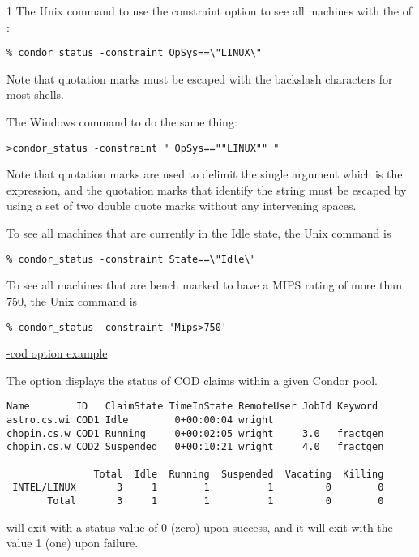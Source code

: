 \begin{ManPage}{\label{man-condor-status}}{1}
The Unix command
to use the constraint option to see all machines with the 
of :
\begin{verbatim}
% condor_status -constraint OpSys==\"LINUX\"
\end{verbatim}
Note that quotation marks must be escaped with the backslash characters
for most shells.

The Windows command to do the same thing:
\begin{verbatim}
>condor_status -constraint " OpSys==""LINUX"" "
\end{verbatim}
Note that quotation marks are used to delimit the single argument which
is the expression, and the quotation marks that identify the string
must be escaped by using a set of two double quote marks without
any intervening spaces.

To see all machines that are currently in the Idle state,
the Unix command is
\begin{verbatim}
% condor_status -constraint State==\"Idle\"
\end{verbatim}

To see all machines that are bench marked to have a MIPS rating
of more than 750, the Unix command is
\begin{verbatim}
% condor_status -constraint 'Mips>750' 
\end{verbatim}

\underline{-cod option example}

The  option displays the status of COD
claims within a given Condor pool. 

\footnotesize
\begin{verbatim}
Name        ID   ClaimState TimeInState RemoteUser JobId Keyword
astro.cs.wi COD1 Idle        0+00:00:04 wright
chopin.cs.w COD1 Running     0+00:02:05 wright     3.0   fractgen
chopin.cs.w COD2 Suspended   0+00:10:21 wright     4.0   fractgen

               Total  Idle  Running  Suspended  Vacating  Killing
 INTEL/LINUX       3     1        1          1         0        0
       Total       3     1        1          1         0        0
\end{verbatim}
\normalsize


\ExitStatus

 will exit with a status value of 0 (zero) upon success,
and it will exit with the value 1 (one) upon failure.

\end{ManPage}

